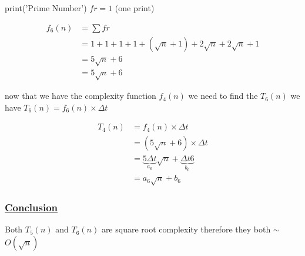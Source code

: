 \vspace{0.15cm}

\textcolor{purplePlot!80!black}{print}(\textcolor{blueArea!60!black}{'Prime Number'}) \hspace{1.95cm} \(fr = 1\) (one print)

\vspace{0.75cm}

\begin{align*}
f_6(n) &= \sum fr \\
       &= 1 + 1 + 1 + 1 + (\sqrt{n}+1) + 2\sqrt{n} + 2\sqrt{n} + 1 \\
       &= 5\sqrt{n} + 6 \\
       &= \boxed{5\sqrt{n} + 6}
\end{align*}

\vspace{0.5cm} 
now that we have the complexity function \(f_4(n)\) we need to find the \(T_6(n)\)  we have \(T_6(n) = f_6(n) \times \Delta t\)

\begin{align*}
T_4(n) &= f_4(n) \times \Delta t\\ 
       &= (5\sqrt{n} + 6) \times \Delta t \\
       &= \underbrace{5 \Delta t}_{a_6} \sqrt{n} + \underbrace{\Delta t 6}_{b_6} \\
&= \boxed{a_6\sqrt{n}+b_6} 
\end{align*}

\subsubsection*{\underline{Conclusion}}
Both \(T_5(n)\) and \(T_6(n)\) are square root complexity therefore they both $\sim$ \(O(\sqrt{n})\)

\vspace{1cm}


